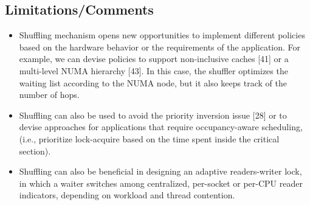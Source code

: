 \subsection{Limitations/Comments}
\begin{itemize}
\item Shuffling mechanism opens new opportunities to implement different policies based on the hardware behavior or the requirements of the application. For example, we can devise policies to support non-inclusive caches [41] or a multi-level NUMA hierarchy [43]. In this case, the shuffler optimizes the waiting list according to the NUMA node, but it also keeps track of the number of hops. 
\item Shuffling can also be used to avoid the priority inversion issue [28] or to devise approaches for applications that require occupancy-aware scheduling, (i.e., prioritize lock-acquire based on the time spent inside the critical section). 
\item Shuffling can also be beneficial in designing an adaptive readers-writer lock, in which a waiter switches among centralized, per-socket or per-CPU reader indicators, depending on workload and thread contention.
\end{itemize}
\newpage


